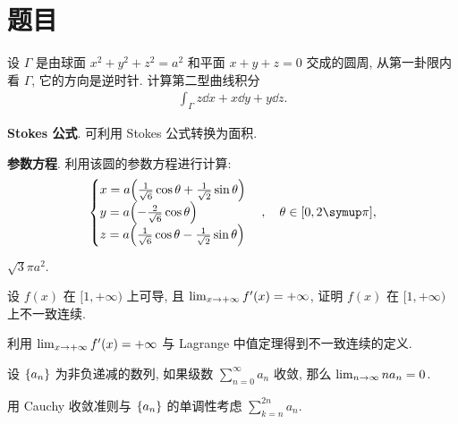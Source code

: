 \section{题目}

\startexercise
\begin{exercise}[series=exer]
    \item 设 $ \Gamma $ 是由球面 $ x^{2} + y^{2} + z^{2} = a^{2} $ 和平面 $ x + y + z = 0 $ 交成的圆周, 从第一卦限内看 $ \Gamma $, 它的方向是逆时针. 计算第二型曲线积分 
    \begin{align*}
        \int_{\Gamma} z \dd{x} + x \dd{y} + y \dd{z}.
    \end{align*}
    \begin{hint}
        \begin{hintsheet}
            \item \textbf{Stokes 公式}. 可利用 Stokes 公式转换为面积.
            \item \textbf{参数方程}. 利用该圆的参数方程进行计算:
            \begin{align*}
                \begin{cases}
                    x = a\qty(\frac{1}{\sqrt{6}}\cos \theta + \frac{1}{\sqrt{2}}\sin \theta)\\
                    y = a\qty(-\frac{2}{\sqrt{6}}\cos \theta)\\
                    z = a\qty(\frac{1}{\sqrt{6}}\cos \theta - \frac{1}{\sqrt{2}}\sin \theta)
                \end{cases}, \quad \theta\in [0, 2\pi],
            \end{align*}
        \end{hintsheet}
    \end{hint}
    \begin{answer}
        $ \sqrt{3}\pi a^{2}. $ 
    \end{answer}
    \item 设 $ f(x) $ 在 $ [1, +\infty) $ 上可导, 且 $ \lim_{x \to +\infty}f'(x) = +\infty $, 证明 $ f(x) $ 在 $ [1, +\infty) $ 上不一致连续.
    \begin{hint}
        利用 $ \lim_{x \to +\infty}f'(x) = +\infty $ 与 Lagrange 中值定理得到不一致连续的定义.
    \end{hint}
    \item 设 $ \qty{a_{n}} $ 为非负递减的数列, 如果级数 $ \sum_{n=0}^{\infty}a_{n} $ 收敛, 那么 $ \lim_{n \to \infty} na_{n} = 0 $. 
    \begin{hint}
        用 Cauchy 收敛准则与 $ \qty{a_{n}} $ 的单调性考虑 $ \sum_{k = n}^{2n} a_{n} $. 

\end{hint}
\end{exercise}
